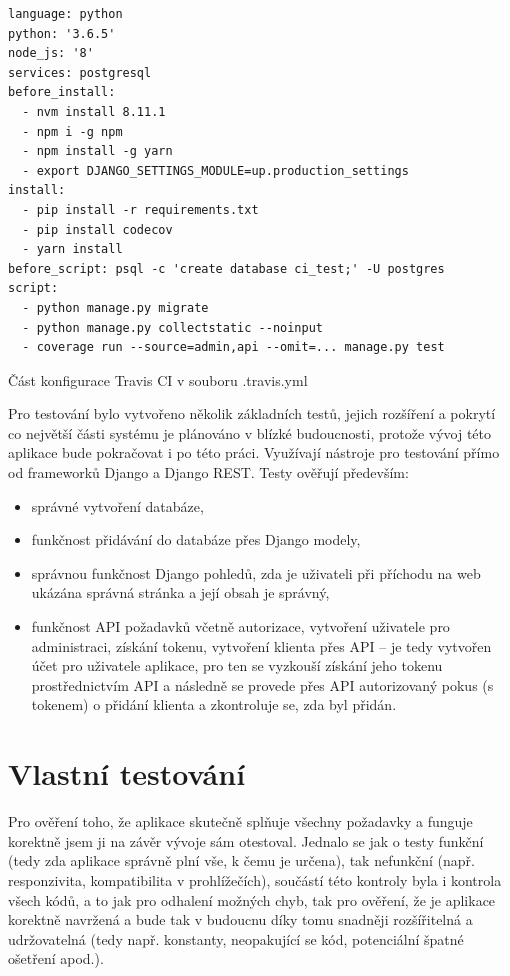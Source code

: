     \begin{listing}[ht]
    	\begin{verbatim}
language: python
python: '3.6.5'
node_js: '8'
services: postgresql
before_install:
  - nvm install 8.11.1
  - npm i -g npm
  - npm install -g yarn
  - export DJANGO_SETTINGS_MODULE=up.production_settings
install:
  - pip install -r requirements.txt
  - pip install codecov
  - yarn install
before_script: psql -c 'create database ci_test;' -U postgres
script:
  - python manage.py migrate
  - python manage.py collectstatic --noinput
  - coverage run --source=admin,api --omit=... manage.py test
    	\end{verbatim}
    	\caption{Část konfigurace Travis CI v souboru .travis.yml}\label{travis}
    \end{listing}
    
    Pro testování bylo vytvořeno několik základních testů, jejich rozšíření a pokrytí co největší části systému je plánováno v blízké budoucnosti, protože vývoj této aplikace bude pokračovat i po této práci. Využívají nástroje pro testování přímo od frameworků Django a Django REST. Testy ověřují především:
        \begin{itemize}
            \item správné vytvoření databáze,
            \item funkčnost přidávání do databáze přes Django modely,
            \item správnou funkčnost Django pohledů, zda je uživateli při příchodu na web ukázána správná stránka a její obsah je správný,
            \item funkčnost API požadavků včetně autorizace, vytvoření uživatele pro administraci, získání tokenu, vytvoření klienta přes API -- je tedy vytvořen účet pro uživatele aplikace, pro ten se vyzkouší získání jeho tokenu prostřednictvím API a následně se provede přes API autorizovaný pokus (s tokenem) o přidání klienta a zkontroluje se, zda byl přidán.
        \end{itemize}

    \section{Vlastní testování}
    Pro ověření toho, že aplikace skutečně splňuje všechny požadavky a funguje korektně jsem ji na závěr vývoje sám otestoval. Jednalo se jak o testy funkční (tedy zda aplikace správně plní vše, k čemu je určena), tak nefunkční (např. responzivita, kompatibilita v prohlížečích), součástí této kontroly byla i kontrola všech kódů, a to jak pro odhalení možných chyb, tak pro ověření, že je aplikace korektně navržená a bude tak v budoucnu díky tomu snadněji rozšířitelná a udržovatelná (tedy např. konstanty, neopakující se kód, potenciální špatné ošetření apod.).
    
